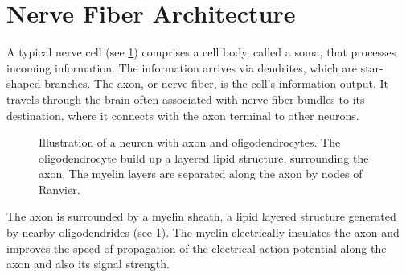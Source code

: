 \section{Nerve Fiber Architecture} \label{sec:fiberArchitecture}
%
A typical nerve cell (see \cref{fig:CortexAndNerveCell}) comprises a cell body, called a soma, that processes incoming information.
The information arrives via dendrites, which are star-shaped branches.
The axon, or nerve fiber, is the cell's information output.
It travels through the brain often associated with nerve fiber bundles to its destination, where it connects with the axon terminal to other neurons.
\par
%
\begin{figure}[!t]
\setlength{\tikzwidth}{0.75\textwidth}
\centering
\tikzset{external/export next=false}
\caption[]{Illustration of a neuron with axon and oligodendrocytes.
    The oligodendrocyte build up a layered lipid structure, surrounding the axon.
    The myelin layers are separated along the axon by nodes of Ranvier.}
\label{fig:CortexAndNerveCell}
\end{figure}
%
The axon is surrounded by a myelin sheath, a lipid layered structure generated by nearby oligodendrides (see \cref{fig:CortexAndNerveCell}).
The myelin electrically insulates the axon and improves the speed of propagation of the electrical action potential along the axon and also its signal strength.
